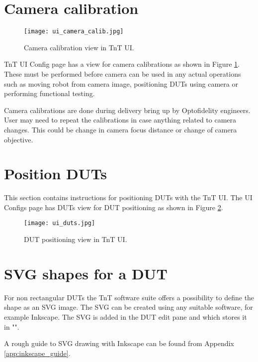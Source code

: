 \section{Camera calibration}

\begin{figure}[h]
	\centering
	\texttt{[image: ui\_camera\_calib.jpg]}
	\caption{Camera calibration view in TnT UI.}
	\label{fig:ui_camera_calib}
\end{figure}

TnT UI Config page has a view for camera calibrations as shown in Figure \ref{fig:ui_camera_calib}. These must be performed before camera can be used in any actual operations such as moving robot from camera image, positioning DUTs using camera or performing functional testing.

Camera calibrations are done during delivery bring up by Optofidelity engineers. User may need to repeat the calibrations in case anything related to camera changes. This could be change in camera focus distance or change of camera objective.




\section{Position DUTs}

This section contains instructions for positioning DUTs with the TnT UI. The UI Configs page has DUTs view for DUT positioning as shown in Figure \ref{fig:ui_duts}.

\begin{figure}[h]
	\centering
	\texttt{[image: ui\_duts.jpg]}
	\caption{DUT positioning view in TnT UI.}
	\label{fig:ui_duts}
\end{figure}


 
\section{SVG shapes for a DUT}
For non rectangular DUTs the TnT software suite offers a possibility to define the shape as an SVG image. The SVG can be created using any suitable software, for example Inkscape. The SVG is added in the DUT edit pane and which stores it in "\svgFilePath".

A rough guide to SVG drawing with Inkscape can be found from Appendix \ref{app:inkscape_guide}.

